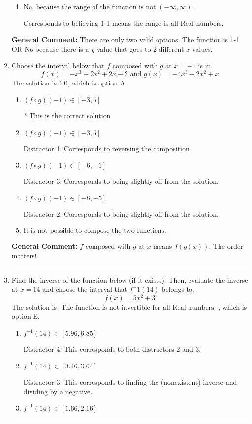 \documentclass{extbook}[14pt]
\newcommand{\litem}[1]{\item #1

\rule{\textwidth}{0.4pt}}
\begin{document}
\begin{enumerate}
{\begin{enumerate}[label=\Alph*.]
Corresponds to the Vertical Line test, which checks if an expression is a function.
\item \( \text{No, because the range of the function is not $(-\infty, \infty)$.} \)

Corresponds to believing 1-1 means the range is all Real numbers.
\end{enumerate}

\textbf{General Comment:} There are only two valid options: The function is 1-1 OR No because there is a $y$-value that goes to 2 different $x$-values.
}
\litem{
Choose the interval below that $f$ composed with $g$ at $x=-1$ is in.
\[ f(x) = -x^{3} +2 x^{2} +2 x -2 \text{ and } g(x) = -4x^{3} -2 x^{2} +x \]The solution is \( 1.0 \), which is option A.\begin{enumerate}[label=\Alph*.]
\item \( (f \circ g)(-1) \in [-3, 5] \)

* This is the correct solution
\item \( (f \circ g)(-1) \in [-3, 5] \)

 Distractor 1: Corresponds to reversing the composition.
\item \( (f \circ g)(-1) \in [-6, -1] \)

 Distractor 3: Corresponds to being slightly off from the solution.
\item \( (f \circ g)(-1) \in [-8, -5] \)

 Distractor 2: Corresponds to being slightly off from the solution.
\item \( \text{It is not possible to compose the two functions.} \)


\end{enumerate}

\textbf{General Comment:} $f$ composed with $g$ at $x$ means $f(g(x))$. The order matters!
}
\litem{
Find the inverse of the function below (if it exists). Then, evaluate the inverse at $x = 14$ and choose the interval that $f^-1(14)$ belongs to.
\[ f(x) = 5 x^2 + 3 \]The solution is \( \text{ The function is not invertible for all Real numbers. } \), which is option E.\begin{enumerate}[label=\Alph*.]
\item \( f^{-1}(14) \in [5.96, 6.85] \)

 Distractor 4: This corresponds to both distractors 2 and 3.
\item \( f^{-1}(14) \in [3.46, 3.64] \)

 Distractor 3: This corresponds to finding the (nonexistent) inverse and dividing by a negative.
\item \( f^{-1}(14) \in [1.66, 2.16] \)


\end{enumerate}}
\end{enumerate}
\end{document}
